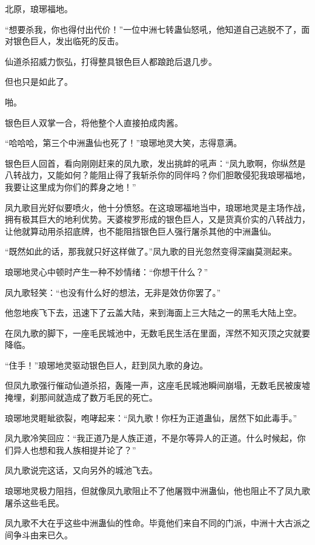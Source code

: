 
\begin{this_body}

北原，琅琊福地。

“想要杀我，你也得付出代价！”一位中洲七转蛊仙怒吼，他知道自己逃脱不了，面对银色巨人，发出临死的反击。

仙道杀招威力恢弘，打得整具银色巨人都踉跄后退几步。

但也只是如此了。

啪。

银色巨人双掌一合，将他整个人直接拍成肉酱。

“哈哈哈，第三个中洲蛊仙也死了！”琅琊地灵大笑，志得意满。

银色巨人回首，看向刚刚赶来的凤九歌，发出挑衅的吼声：“凤九歌啊，你纵然是八转战力，又能如何？能阻止得了我斩杀你的同伴吗？你们胆敢侵犯我琅琊福地，我要让这里成为你们的葬身之地！”

凤九歌目光好似要喷火，他十分愤怒。在这琅琊福地当中，琅琊地灵是主场作战，拥有极其巨大的地利优势。天婆梭罗形成的银色巨人，又是货真价实的八转战力，让他就算动用杀招底牌，也不能阻挡银色巨人强行屠杀其他的中洲蛊仙。

“既然如此的话，那我就只好这样做了。”凤九歌的目光忽然变得深幽莫测起来。

琅琊地灵心中顿时产生一种不妙情绪：“你想干什么？”

凤九歌轻笑：“也没有什么好的想法，无非是效仿你罢了。”

他忽地疾飞下去，迅速下了云盖大陆，来到海面上三大陆之一的黑毛大陆上空。

在凤九歌的脚下，一座毛民城池中，无数毛民生活在里面，浑然不知灭顶之灾就要降临。

“住手！”琅琊地灵驱动银色巨人，赶到凤九歌的身边。

但凤九歌强行催动仙道杀招，轰隆一声，这座毛民城池瞬间崩塌，无数毛民被废墟掩埋，刹那间就造成了数万毛民的死亡。

琅琊地灵睚眦欲裂，咆哮起来：“凤九歌！你枉为正道蛊仙，居然下如此毒手。”

凤九歌冷笑回应：“我正道乃是人族正道，不是尔等异人的正道。什么时候起，你们异人也想和我人族相提并论了？”

凤九歌说完这话，又向另外的城池飞去。

琅琊地灵极力阻挡，但就像凤九歌阻止不了他屠戮中洲蛊仙，他也阻止不了凤九歌屠杀这些毛民。

凤九歌不大在乎这些中洲蛊仙的性命。毕竟他们来自不同的门派，中洲十大古派之间争斗由来已久。


\end{this_body}

